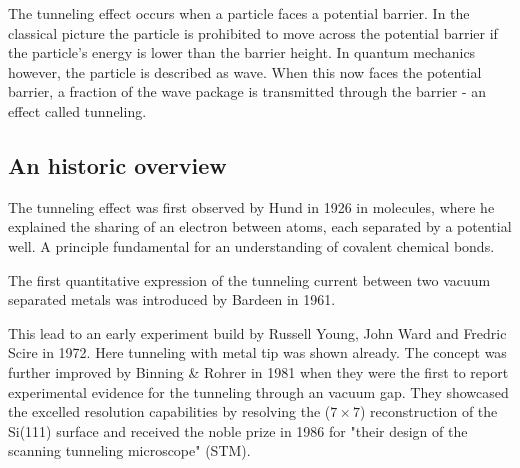 The tunneling effect occurs when a particle faces a potential barrier. In the classical picture the particle is prohibited to move across the potential barrier if the particle's energy is lower than the barrier height. In quantum mechanics however, the particle is described as wave. When this now faces the potential barrier, a fraction of the wave package is transmitted through the barrier - an effect called tunneling.

\subsection{An historic overview}
The tunneling effect was first observed by Hund in 1926 in molecules, where he explained the sharing of an electron between atoms, each separated by a potential well.\cite{Mehra_tunneling_1982} A principle fundamental for an understanding of covalent chemical bonds. 

The first quantitative expression of the tunneling current between two vacuum separated metals was introduced by Bardeen in 1961.\cite{Bardeen_tunneling_1961} 

This lead to an early experiment build by Russell Young, John Ward and Fredric Scire in 1972.\cite{Young_topographiner_1972} Here tunneling with metal tip was shown already. The concept was further improved by Binning \& Rohrer in 1981 when they were the first to report experimental evidence for the tunneling through an vacuum gap.\cite{binning_tunneling_1982} They showcased the excelled resolution capabilities by resolving the ($7 \times 7$) reconstruction of the Si(111) surface \cite{binnig_1983} and received the noble prize in 1986 for "their design of the scanning tunneling microscope" (STM).\cite{_noble_price_1986} 

